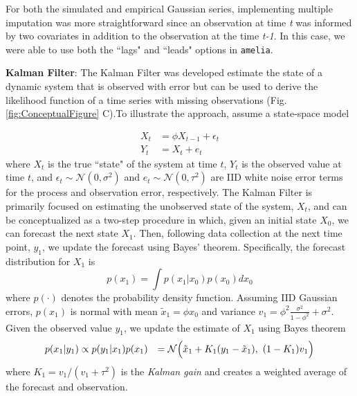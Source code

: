 For both the simulated and empirical Gaussian series, implementing multiple imputation was more straightforward since an observation at time \textit{t} was informed by two covariates in addition to the observation at the time \textit{t-1}. In this case, we were able to use both the ``lags" and ``leads" options in \texttt{amelia}. 

\textbf{Kalman Filter}: The Kalman Filter was developed estimate the state of a dynamic system that is observed with error but can be used to derive the likelihood function of a time series with missing observations (Fig. \ref{fig:ConceptualFigure} C).To illustrate the approach, assume a state-space model

\begin{equation*}
    \begin{aligned}
        X_t &= \phi X_{t-1} + \epsilon_t \\Y_t &= X_t + e_t
    \end{aligned}
\end{equation*}
where $X_t$ is the true ``state" of the system at time $t$, $Y_t$ is the observed value at time $t$, and $\epsilon_t \sim \mathcal{N}(0, \sigma^2)$ and $e_t \sim \mathcal{N}(0, \tau^2)$ are IID white noise error terms for the process and observation error, respectively. The Kalman Filter is primarily focused on estimating the unobserved state of the system, $X_t$, and can be conceptualized as a two-step procedure in which, given an initial state $X_0$, we can forecast the next state $X_1$. Then, following data collection at the next time point, $y_1$, we update the forecast using Bayes' theorem. Specifically, the forecast distribution for $X_1$ is
\begin{equation*}
    p(x_1) = \int p(x_1 | x_0)p(x_0)dx_0
\end{equation*}
where $p(\cdot)$ denotes the probability density function. Assuming IID Gaussian errors, $p(x_1)$ is normal with mean ${\tilde x}_1 = \phi x_0$ and variance $v_1 = \phi^2 \frac{\sigma^2}{1 - \phi^2} + \sigma^2$. Given the observed value $y_1$, we update the estimate of $X_1$ using Bayes theorem
\begin{equation*}
    \begin{aligned}
        p(x_1 | y_1) &\propto p(y_1 | x_1) p(x_1)
        &= \mathcal{N}\Bigl(\tilde x_1 + K_1(y_1 - \tilde x_1),\ (1 - K_1)v_1 \Bigr)
    \end{aligned} 
\end{equation*}
where $K_1 = v_1 / (v_1 + \tau^2)$ is the \textit{Kalman gain} and creates a weighted average of the forecast and observation. %
